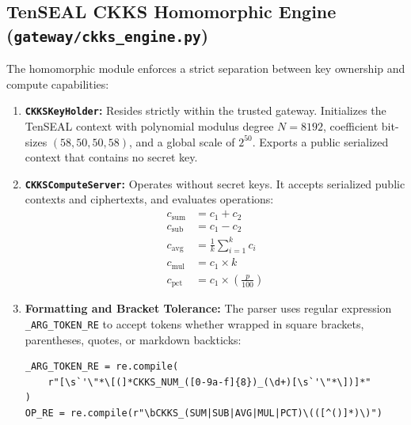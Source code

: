 \documentclass[12pt,a4paper,oneside]{report}
\numberwithin{equation}{chapter}
\begin{document}
\subsection{TenSEAL CKKS Homomorphic Engine (\texttt{gateway/ckks\_engine.py})}
The homomorphic module enforces a strict separation between key ownership and compute capabilities:
\begin{enumerate}[leftmargin=*]
    \item \textbf{\texttt{CKKSKeyHolder}:} Resides strictly within the trusted gateway. Initializes the TenSEAL context with polynomial modulus degree $N=8192$, coefficient bit-sizes $(58, 50, 50, 58)$, and a global scale of $2^{50}$. Exports a public serialized context that contains no secret key.
    \item \textbf{\texttt{CKKSComputeServer}:} Operates without secret keys. It accepts serialized public contexts and ciphertexts, and evaluates operations:
    \begin{align}
        c_{\text{sum}} &= c_1 + c_2 \\
        c_{\text{sub}} &= c_1 - c_2 \\
        c_{\text{avg}} &= \frac{1}{k} \sum_{i=1}^k c_i \\
        c_{\text{mul}} &= c_1 \times k \\
        c_{\text{pct}} &= c_1 \times \left(\frac{p}{100}\right)
    \end{align}
    \item \textbf{Formatting and Bracket Tolerance:} The parser uses regular expression \texttt{\_ARG\_TOKEN\_RE} to accept tokens whether wrapped in square brackets, parentheses, quotes, or markdown backticks:
    \begin{verbatim}
_ARG_TOKEN_RE = re.compile(
    r"[\s`'\"*\[(]*CKKS_NUM_([0-9a-f]{8})_(\d+)[\s`'\"*\])]*"
)
OP_RE = re.compile(r"\bCKKS_(SUM|SUB|AVG|MUL|PCT)\(([^()]*)\)")
    \end{verbatim}
\end{enumerate}
\end{document}
